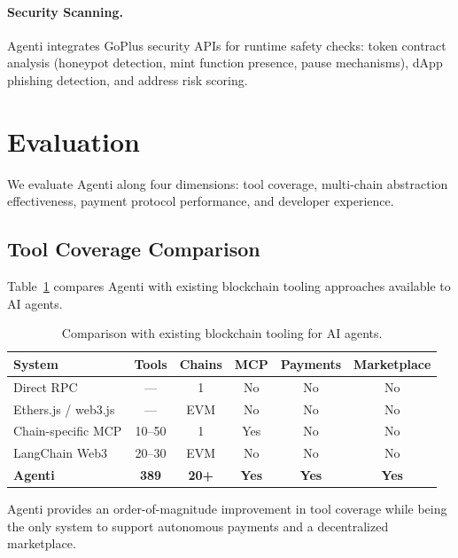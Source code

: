 \documentclass[11pt]{article}
\begin{document}
\paragraph{Security Scanning.} Agenti integrates GoPlus security APIs for runtime safety checks: token contract analysis (honeypot detection, mint function presence, pause mechanisms), dApp phishing detection, and address risk scoring.

\section{Evaluation}
\label{sec:evaluation}

We evaluate Agenti along four dimensions: tool coverage, multi-chain abstraction effectiveness, payment protocol performance, and developer experience.

\subsection{Tool Coverage Comparison}

Table~\ref{tab:comparison} compares Agenti with existing blockchain tooling approaches available to AI agents.

\begin{table}[h]
\centering
\caption{Comparison with existing blockchain tooling for AI agents.}
\label{tab:comparison}
\begin{tabular}{@{}lccccc@{}}
\toprule
\textbf{System} & \textbf{Tools} & \textbf{Chains} & \textbf{MCP} & \textbf{Payments} & \textbf{Marketplace} \\
\midrule
Direct RPC           & --- & 1     & No  & No  & No  \\
Ethers.js / web3.js  & --- & EVM   & No  & No  & No  \\
Chain-specific MCP   & 10--50 & 1  & Yes & No  & No  \\
LangChain Web3       & 20--30 & EVM & No  & No  & No  \\
\textbf{Agenti}      & \textbf{389} & \textbf{20+} & \textbf{Yes} & \textbf{Yes} & \textbf{Yes} \\
\bottomrule
\end{tabular}
\end{table}

Agenti provides an order-of-magnitude improvement in tool coverage while being the only system to support autonomous payments and a decentralized marketplace.
\end{document}
